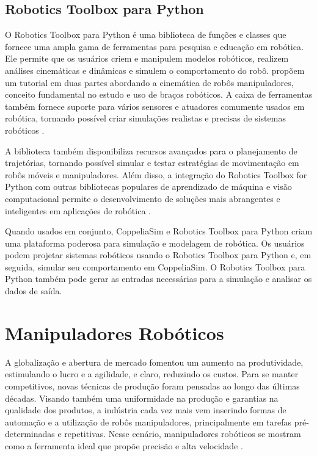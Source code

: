 \subsection{Robotics Toolbox para Python}
O Robotics Toolbox para Python é uma biblioteca de funções e classes que fornece uma ampla gama de ferramentas para pesquisa e educação em robótica. Ele permite que os usuários criem e manipulem modelos robóticos, realizem análises cinemáticas e dinâmicas e simulem o comportamento do robô.  propõem um tutorial em duas partes abordando a cinemática de robôs manipuladores, conceito fundamental no estudo e uso de braços robóticos. A caixa de ferramentas também fornece suporte para vários sensores e atuadores comumente usados em robótica, tornando possível criar simulações realistas e precisas de sistemas robóticos \cite{rtb2021}.

A biblioteca também disponibiliza recursos avançados para o planejamento de trajetórias, tornando possível simular e testar estratégias de movimentação em robôs móveis e manipuladores. Além disso, a integração do Robotics Toolbox for Python com outras bibliotecas populares de aprendizado de máquina e visão computacional permite o desenvolvimento de soluções mais abrangentes e inteligentes em aplicações de robótica \cite{rtb2021}. 

Quando usados em conjunto, CoppeliaSim e Robotics Toolbox para Python criam uma plataforma poderosa para simulação e modelagem de robótica. Os usuários podem projetar sistemas robóticos usando o Robotics Toolbox para Python e, em seguida, simular seu comportamento em CoppeliaSim. O Robotics Toolbox para Python também pode gerar as entradas necessárias para a simulação e analisar os dados de saída.


\section{Manipuladores Robóticos}

A globalização e abertura de mercado fomentou um aumento na produtividade, estimulando o lucro e a agilidade, e claro, reduzindo os custos. Para se manter competitivos, novas técnicas de produção foram pensadas ao longo das últimas décadas. Visando também uma uniformidade na produção e garantias na qualidade dos produtos, a indústria cada vez mais vem inserindo formas de automação e a utilização de robôs manipuladores, principalmente em tarefas pré-determinadas e repetitivas. Nesse cenário, manipuladores robóticos se mostram como a ferramenta ideal que propõe precisão e alta velocidade \cite{Vale2011}.

